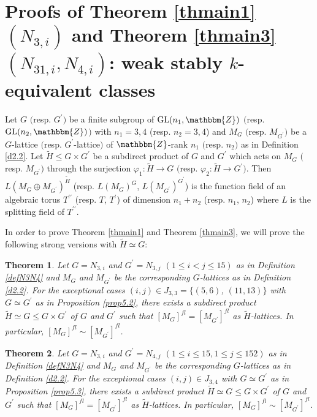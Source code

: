 \documentclass{amsart}
\theoremstyle{plain}
\newtheorem{theorem}{Theorem}[section]
\theoremstyle{definition}
\theoremstyle{remark}
\newcommand{\bZ}{\mathbbm{Z}}\newcommand{\bQ}{\mathbbm{Q}}
\newcommand{\GL}{{\rm GL}}\newcommand{\SL}{{\rm SL}}
\newcounter{sub}\def\tr{\mbox{tr }}
\begin{document}
\section{Proofs of {Theorem \ref{thmain1}} $(N_{3,i})$ and {Theorem \ref{thmain3}} $(N_{31,i}, N_{4,i})$: weak stably $k$-equivalent classes}\label{S6} %

Let $G$ $($resp. $G^\prime$$)$ be a finite subgroup of 
$\GL(n_1,\bZ)$ $($resp. $\GL(n_2,\bZ)$$)$ 
with $n_1=3,4$ (resp. $n_2=3,4$) 
and $M_G$ $($resp. $M_{G^\prime}$$)$ be a $G$-lattice 
$($resp. $G^\prime$-lattice$)$ of $\bZ$-rank $n_1$ $($resp. $n_2)$ 
as in Definition \ref{d2.2}. 
%
Let $\widetilde{H}\leq G\times G^\prime$ be a subdirect product 
of $G$ and $G^\prime$ 
which acts on $M_G$ 
$($resp. $M_{G^\prime}$$)$ 
through the surjection $\varphi_1: \widetilde{H} \rightarrow G$ 
$($resp. $\varphi_2: \widetilde{H} \rightarrow G^\prime$$)$. 
Then $L(M_G\oplus M_{G^\prime})^{\widetilde{H}}$ 
(resp. $L(M_G)^G$, $L(M_{G^\prime})^{G^\prime}$) 
is the function field of an algebraic torus $T^{\prime\prime}$ 
(resp. $T$, $T^\prime$) of dimension $n_1+n_2$ (resp. $n_1$, $n_2$) 
where $L$ is the splitting field of $T^{\prime\prime}$. 

In order to prove Theorem \ref{thmain1} and Theorem \ref{thmain3}, 
we will prove the following strong versions with $\widetilde{H}\simeq G$: 

\begin{theorem}\label{th6.1}
Let $G=N_{3,i}$ and $G^\prime=N_{3,j}$ $(1\leq i<j\leq 15)$ 
as in Definition \ref{defN3N4} 
and $M_G$ and $M_{G^\prime}$ 
be the corresponding $G$-lattices as in Definition \ref{d2.2}. 
For the exceptional cases $(i,j)\in J_{3,3}=\{(5,6)$, $(11,13)\}$ 
with $G\simeq G^\prime$ 
as in Proposition \ref{prop5.2}, 
there exists a subdirect product 
$\widetilde{H}\simeq G\leq G\times G^\prime$ of $G$ and $G^\prime$ 
such that $[M_G]^{fl}=[M_{G^\prime}]^{fl}$ as $\widetilde{H}$-lattices. 
In particular, $[M_G]^{fl}\sim [M_{G^\prime}]^{fl}$.
\end{theorem}

\begin{theorem}\label{th6.2}
Let $G=N_{3,i}$ and $G^\prime=N_{4,j}$ $(1\leq i\leq 15, 1\leq j\leq 152)$ 
as in Definition \ref{defN3N4} 
and $M_G$ and $M_{G^\prime}$ 
be the corresponding $G$-lattices as in Definition \ref{d2.2}. 
For the exceptional cases $(i,j)\in J_{3,4}$ with $G\simeq G^\prime$ 
as in Proposition \ref{prop5.3}, 
there exists a subdirect product 
$\widetilde{H}\simeq G\leq G\times G^\prime$ of $G$ and $G^\prime$ 
such that $[M_G]^{fl}=[M_{G^\prime}]^{fl}$ as $\widetilde{H}$-lattices. 
In particular, $[M_G]^{fl}\sim [M_{G^\prime}]^{fl}$.
\end{theorem}
\end{document}
